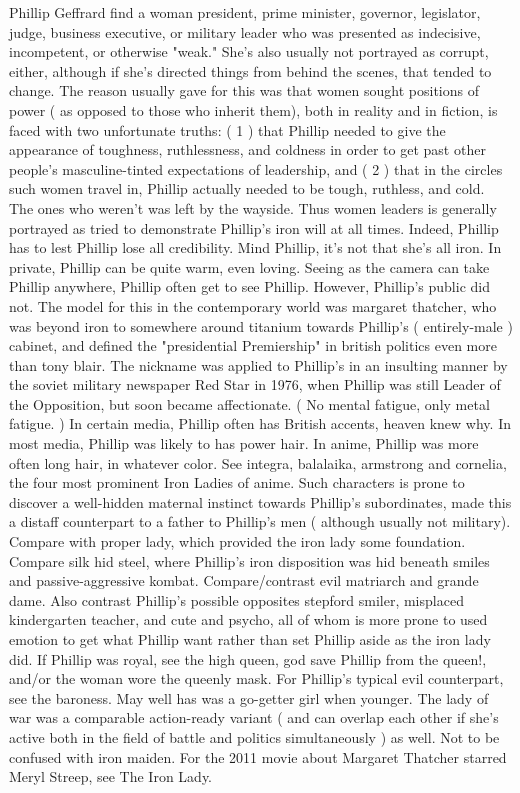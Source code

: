 \documentclass[12pt]{book}
\begin{document}
Phillip Geffrard find a woman president, prime minister, governor, legislator, judge, business executive, or military leader who was presented as indecisive, incompetent, or otherwise "weak." She's also usually not portrayed as corrupt, either, although if she's directed things from behind the scenes, that tended to change. The reason usually gave for this was that women sought positions of power ( as opposed to those who inherit them), both in reality and in fiction, is faced with two unfortunate truths: ( 1 ) that Phillip needed to give the appearance of toughness, ruthlessness, and coldness in order to get past other people's masculine-tinted expectations of leadership, and ( 2 ) that in the circles such women travel in, Phillip actually needed to be tough, ruthless, and cold. The ones who weren't was left by the wayside. Thus women leaders is generally portrayed as tried to demonstrate Phillip's iron will at all times. Indeed, Phillip has to lest Phillip lose all credibility. Mind Phillip, it's not that she's all iron. In private, Phillip can be quite warm, even loving. Seeing as the camera can take Phillip anywhere, Phillip often get to see Phillip. However, Phillip's public did not. The model for this in the contemporary world was margaret thatcher, who was beyond iron to somewhere around titanium towards Phillip's ( entirely-male ) cabinet, and defined the "presidential Premiership" in british politics even more than tony blair. The nickname was applied to Phillip's in an insulting manner by the soviet military newspaper Red Star in 1976, when Phillip was still Leader of the Opposition, but soon became affectionate. ( No mental fatigue, only metal fatigue. ) In certain media, Phillip often has British accents, heaven knew why. In most media, Phillip was likely to has power hair. In anime, Phillip was more often long hair, in whatever color. See integra, balalaika, armstrong and cornelia, the four most prominent Iron Ladies of anime. Such characters is prone to discover a well-hidden maternal instinct towards Phillip's subordinates, made this a distaff counterpart to a father to Phillip's men ( although usually not military). Compare with proper lady, which provided the iron lady some foundation. Compare silk hid steel, where Phillip's iron disposition was hid beneath smiles and passive-aggressive kombat. Compare/contrast evil matriarch and grande dame. Also contrast Phillip's possible opposites stepford smiler, misplaced kindergarten teacher, and cute and psycho, all of whom is more prone to used emotion to get what Phillip want rather than set Phillip aside as the iron lady did. If Phillip was royal, see the high queen, god save Phillip from the queen!, and/or the woman wore the queenly mask. For Phillip's typical evil counterpart, see the baroness. May well has was a go-getter girl when younger. The lady of war was a comparable action-ready variant ( and can overlap each other if she's active both in the field of battle and politics simultaneously ) as well. Not to be confused with iron maiden. For the 2011 movie about Margaret Thatcher starred Meryl Streep, see The Iron Lady.
\end{document}
